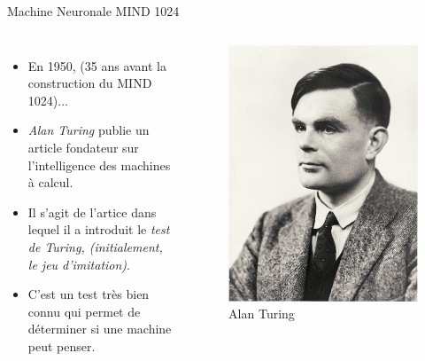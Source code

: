 \documentclass{beamer}
\begin{document}
\begin{frame}{Machine Neuronale MIND 1024}
    \begin{columns}[T]
            \begin{itemize}[<+-| alert@+>] %
                \item En 1950, (35 ans avant la construction du MIND 1024)...
                \item \textit{Alan Turing} publie un article fondateur sur l'intelligence des machines à calcul.
                \item Il s'agit de l'artice dans lequel il a introduit le \textit{test de Turing, (initialement, le jeu d'imitation)}.
                \item C'est un test très bien connu qui permet de déterminer si une machine peut penser.
            \end{itemize}
            \begin{figure}
                \centering
                \includegraphics[width=0.8\linewidth]{pic/alan-turing.jpeg}
                \caption{Alan Turing}
            \end{figure}
    \end{columns}
\end{frame}
\end{document}
